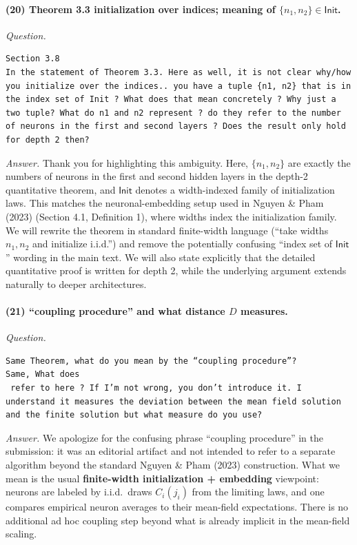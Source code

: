 \documentclass[11pt,a4paper]{article}
\newcommand{\NP}{Nguyen \& Pham (2023)}
\begin{document}
\paragraph{(20) Theorem 3.3 initialization over indices; meaning of $\{n_1,n_2\}\in\mathsf{Init}$.}
\textit{Question.}\par
\begin{verbatim}
Section 3.8
In the statement of Theorem 3.3. Here as well, it is not clear why/how you initialize over the indices.. you have a tuple {n1, n2} that is in the index set of Init ? What does that mean concretely ? Why just a two tuple? What do n1 and n2 represent ? do they refer to the number of neurons in the first and second layers ? Does the result only hold for depth 2 then?
\end{verbatim}
\textit{Answer.} Thank you for highlighting this ambiguity. Here, $\{n_1,n_2\}$ are exactly the numbers of neurons in the first and second hidden layers in the depth-2 quantitative theorem, and $\mathsf{Init}$ denotes a width-indexed family of initialization laws. This matches the neuronal-embedding setup used in \NP{} (Section 4.1, Definition 1), where widths index the initialization family. We will rewrite the theorem in standard finite-width language (``take widths $n_1,n_2$ and initialize i.i.d.'') and remove the potentially confusing ``index set of $\mathsf{Init}$'' wording in the main text. We will also state explicitly that the detailed quantitative proof is written for depth 2, while the underlying argument extends naturally to deeper architectures.

\paragraph{(21) ``coupling procedure'' and what distance $D$ measures.}
\textit{Question.}\par
\begin{verbatim}
Same Theorem, what do you mean by the “coupling procedure”?
Same, What does 
 refer to here ? If I’m not wrong, you don’t introduce it. I understand it measures the deviation between the mean field solution and the finite solution but what measure do you use?
\end{verbatim}
\textit{Answer.} We apologize for the confusing phrase ``coupling procedure'' in the submission: it was an editorial artifact and not intended to refer to a separate algorithm beyond the standard \NP{} construction. What we mean is the usual \textbf{finite-width initialization + embedding} viewpoint: neurons are labeled by i.i.d.\ draws $C_i(j_i)$ from the limiting laws, and one compares empirical neuron averages to their mean-field expectations. There is no additional ad hoc coupling step beyond what is already implicit in the mean-field scaling.
\end{document}

